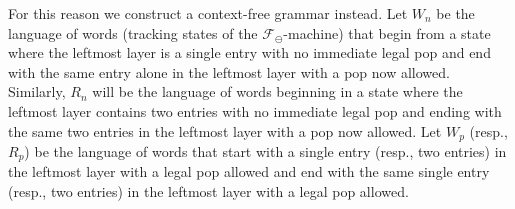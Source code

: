 \documentclass[10pt]{article}
\theoremstyle{plain}
\theoremstyle{definition}
\newcommand{\F}{\mathcal{F}}
\begin{document}

For this reason we construct a context-free grammar instead. Let $W_n$ be the language of words (tracking states of the $\F_\ominus$-machine) that begin from a state where the leftmost layer is a single entry with no immediate legal pop and end with the same entry alone in the leftmost layer with a pop now allowed. Similarly, $R_n$ will be the language of words beginning in a state where the leftmost layer contains two entries with no immediate legal pop and ending with the same two entries in the leftmost layer with a pop now allowed. Let $W_p$ (resp., $R_p$) be the language of words that start with a single entry (resp., two entries) in the leftmost layer with a legal pop allowed and end with the same single entry (resp., two entries) in the leftmost layer with a legal pop allowed.
\end{document}
